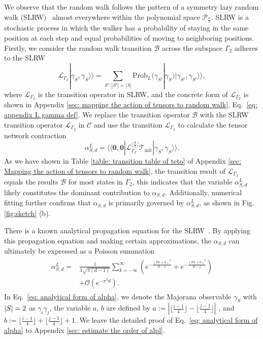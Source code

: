 \documentclass[journal=jctcce,a4paper,manuscript=article]{achemso}
\newcommand{\supket}[1]{|#1 \rangle\rangle}
\newcommand{\supbra}[1]{\langle\langle #1 |}
\newcommand{\Tcal}{\mathcal{T}}
\begin{document}
We observe that the random walk follows the pattern of a symmetry lazy random
walk (SLRW)~\cite{giuggioli2020exact, lawler2010random} almost everywhere
within the {polynomial space $\mathcal{P}_{\frac{n}{2}}$.} SLRW is a stochastic
process in which the walker has a probability of staying in the same position
at each step and equal probabilities of moving to neighboring positions.
Firstly, we consider the random walk transition $\mathcal{B}$ across the
subspace $\Gamma_2$ adheres to the SLRW
\begin{equation}
  \mathcal{L}_{\Gamma_2}\supket{\gamma_S, \gamma_S} = \sum_{S':|S'| = |S|} \mathrm{Prob}_L(\gamma_{S'}|\gamma_S) \supket{\gamma_{S'}, \gamma_{S'}},
\end{equation}
where $\mathcal{L}_{\Gamma_2}$ is the transition operator in SLRW, and the concrete form of $\mathcal{L}_{\Gamma_2}$ is shown in Appendix \ref{sec: mapping the action of tensors to random walk}, Eq.~\eqref{eq: appendix L gamma def}. We replace the transition operator $\mathcal{B}$ with the SLRW transition operator $\mathcal{L}_{\Gamma_2}$ in $\mathcal{C}$ and use the transition $\mathcal{L}_{\Gamma_2}$ to calculate the tensor network contraction
\begin{equation}
  \alpha_{S,d}^L = \supbra{\bm 0,\bm 0} \mathcal{L}_{\Gamma_2}^{\lfloor \frac{d}{2}\rfloor} \Tcal_\text{init} \supket{\gamma_S, \gamma_S}.
  \label{eq: alphal Twhole}
\end{equation}
As we have shown in Table \ref{table: transition table of teto} of Appendix \ref{sec: Mapping the action of tensors to random walk}, the transition result of $\mathcal{L}_{\Gamma_2}$ equals the results $\mathcal{B}$ for most states in $\Gamma_2$, this indicates that the variable $\alpha_{S,d}^L$ likely constitutes the dominant contribution to $\alpha_{S,d}$. Additionally, numerical fitting further confirms that $\alpha_{S,d}$ is primarily governed by $\alpha_{S,d}^L$, as shown in Fig. \ref{fig:sketch} (b).

There is a known analytical propagation equation for the
SLRW~\cite{giuggioli2020exact}. By applying this propagation equation and
making certain approximations, the $ \alpha_{S,d} $ can ultimately be expressed
as a Poisson summation
\begin{align}
  \begin{aligned}
    \alpha_{S,d}^L = & \frac{1}{3\sqrt{\pi (d-1)}} \sum_{k = -\infty}^\infty \left(e^{-\frac{(kn+a)^2}{d-1}} + e^{-\frac{(kn+b)^2}{d-1}}  \right) \\
                     & + \mathcal{O}(e^{-\pi^2 d}).
  \end{aligned}
  \label{eq: analytical form of alpha}
\end{align}
In Eq.~\eqref{eq: analytical form of alpha}, we denote the Majorana observable $\gamma_S$ with $\abs{S} = 2$
as $\gamma_i \gamma_j$, the variable $a$, $b$ are defined by $a:= |\lfloor\frac{i-1}{4}\rfloor-\lfloor\frac{j-1}{4}\rfloor|$ , and $b := \lfloor\frac{i-1}{4}\rfloor+\lfloor\frac{j-1}{4}\rfloor+1$. We leave the detailed proof of Eq.~\eqref{eq: analytical form of alpha}
to Appendix \ref{sec: estimate the order of alpl}.
\end{document}
